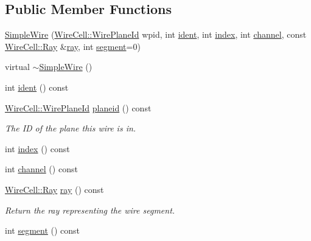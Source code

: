 \subsection*{Public Member Functions}
\begin{DoxyCompactItemize}
\item 
\hyperlink{class_wire_cell_1_1_simple_wire_a22c2fdb5b8d74747e273e8854cabf691}{Simple\+Wire} (\hyperlink{class_wire_cell_1_1_wire_plane_id}{Wire\+Cell\+::\+Wire\+Plane\+Id} wpid, int \hyperlink{class_wire_cell_1_1_simple_wire_a7e7a70124200787e3b325351ab34ec8e}{ident}, int \hyperlink{class_wire_cell_1_1_simple_wire_a30b573d4e30069df22532b79b72d084f}{index}, int \hyperlink{class_wire_cell_1_1_simple_wire_afc85442561cf9421725bde79eb55b611}{channel}, const \hyperlink{namespace_wire_cell_a3ab20d9b438feb7eb1ffaab9ba98af0c}{Wire\+Cell\+::\+Ray} \&\hyperlink{class_wire_cell_1_1_simple_wire_a428dfadc5733bf94b4a422762e55b7f7}{ray}, int \hyperlink{class_wire_cell_1_1_simple_wire_a965be3ecc234084376422ef89af0958c}{segment}=0)
\item 
virtual \hyperlink{class_wire_cell_1_1_simple_wire_a9be6fb69d27f23c5e08d6f3c513a8e59}{$\sim$\+Simple\+Wire} ()
\item 
int \hyperlink{class_wire_cell_1_1_simple_wire_a7e7a70124200787e3b325351ab34ec8e}{ident} () const
\item 
\hyperlink{class_wire_cell_1_1_wire_plane_id}{Wire\+Cell\+::\+Wire\+Plane\+Id} \hyperlink{class_wire_cell_1_1_simple_wire_a73c7459a542146db971644530f8f8d0d}{planeid} () const
\begin{DoxyCompactList}\small\item\em The ID of the plane this wire is in. \end{DoxyCompactList}\item 
int \hyperlink{class_wire_cell_1_1_simple_wire_a30b573d4e30069df22532b79b72d084f}{index} () const
\item 
int \hyperlink{class_wire_cell_1_1_simple_wire_afc85442561cf9421725bde79eb55b611}{channel} () const
\item 
\hyperlink{namespace_wire_cell_a3ab20d9b438feb7eb1ffaab9ba98af0c}{Wire\+Cell\+::\+Ray} \hyperlink{class_wire_cell_1_1_simple_wire_a428dfadc5733bf94b4a422762e55b7f7}{ray} () const
\begin{DoxyCompactList}\small\item\em Return the ray representing the wire segment. \end{DoxyCompactList}\item 
int \hyperlink{class_wire_cell_1_1_simple_wire_a965be3ecc234084376422ef89af0958c}{segment} () const
\end{DoxyCompactItemize}
